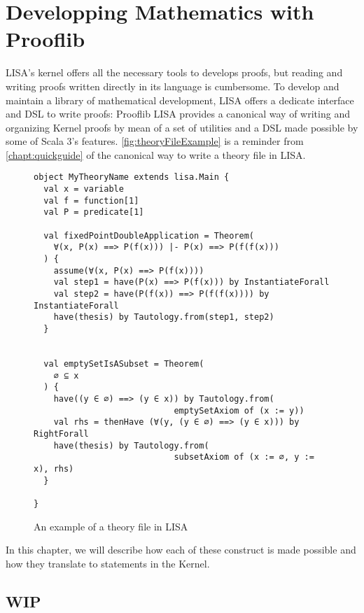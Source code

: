 \chapter{Developping Mathematics with Prooflib}
\label{chapt:prooflib}
LISA's kernel offers all the necessary tools to develops proofs, but  reading and writing proofs written directly in its language is cumbersome. 
To develop and maintain a library of mathematical development, LISA offers a dedicate interface and DSL to write proofs: Prooflib
LISA provides a canonical way of writing and organizing Kernel proofs by mean of a set of utilities and a DSL made possible by some of Scala 3's features.
\autoref{fig:theoryFileExample} is a reminder from \autoref{chapt:quickguide} of the canonical way to write a theory file in LISA.

\begin{figure}
\begin{lstlisting}[language=lisa, frame=single]
object MyTheoryName extends lisa.Main {
  val x = variable
  val f = function[1]
  val P = predicate[1]

  val fixedPointDoubleApplication = Theorem( 
    ∀(x, P(x) ==> P(f(x))) |- P(x) ==> P(f(f(x)))
  ) {
    assume(∀(x, P(x) ==> P(f(x))))
    val step1 = have(P(x) ==> P(f(x))) by InstantiateForall
    val step2 = have(P(f(x)) ==> P(f(f(x)))) by InstantiateForall
    have(thesis) by Tautology.from(step1, step2)
  } 


  val emptySetIsASubset = Theorem(
    ∅ ⊆ x
  ) {
    have((y ∈ ∅) ==> (y ∈ x)) by Tautology.from(
                            emptySetAxiom of (x := y))
    val rhs = thenHave (∀(y, (y ∈ ∅) ==> (y ∈ x))) by RightForall
    have(thesis) by Tautology.from(
                            subsetAxiom of (x := ∅, y := x), rhs)
  }

}
\end{lstlisting}
\caption{An example of a theory file in LISA}
\label{fig:theoryFileExample}
\end{figure}

In this chapter, we will describe how each of these construct is made possible and how they translate to statements in the Kernel.

\section*{WIP}






